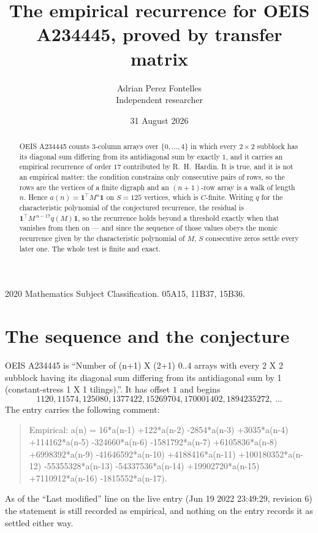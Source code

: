 \documentclass[11pt,a4paper]{article}
\title{The empirical recurrence for OEIS A234445, proved by transfer matrix}
\author{Adrian Perez Fontelles\\ \small Independent researcher}
\date{31 August 2026}
\theoremstyle{plain}
\theoremstyle{definition}
\begin{document}
\maketitle

\begin{abstract}
OEIS A234445 counts $3$-column arrays over $\{0,\dots,4\}$ in which every
$2\times2$ subblock has its diagonal sum differing from its antidiagonal sum by
exactly $1$, and it
carries an empirical recurrence of order $17$ contributed by R.~H.~Hardin. It is true,
and it is not an empirical matter: the condition constrains only consecutive pairs of rows,
so the rows are the vertices of a finite digraph and an $(n+1)$-row array is a walk of
length $n$. Hence $a(n)=\mathbf{1}^{\!\top}M^{n}\mathbf{1}$ on $S=125$ vertices, which
is $C$-finite. Writing $q$ for the characteristic polynomial of the conjectured recurrence,
the residual is $\mathbf{1}^{\!\top}M^{\,n-17}q(M)\mathbf{1}$, so the recurrence
holds beyond a threshold exactly when that vanishes from then on --- and since the sequence
of those values obeys the monic recurrence given by the characteristic polynomial of $M$,
$S$ consecutive zeros settle every later one. The whole test is finite and exact.
\end{abstract}

\noindent\small 2020 Mathematics Subject Classification. 05A15, 11B37, 15B36.\normalsize

\section{The sequence and the conjecture}

OEIS A234445 is ``Number of (n+1) X (2+1) 0..4 arrays with every 2 X 2 subblock having its diagonal sum differing from its antidiagonal sum by 1 (constant-stress 1 X 1 tilings).''. It has offset
$1$ and begins
\[
1120, 11574, 125080, 1377422, 15269704, 170001402, 1894235272,\ \dots
\]
The entry carries the following comment:
\begin{quote}\small
Empirical: a(n) = 16*a(n-1) +122*a(n-2) -2854*a(n-3) +3035*a(n-4) +114162*a(n-5) -324660*a(n-6) -1581792*a(n-7) +6105836*a(n-8) +6998392*a(n-9) -41646592*a(n-10) +4188416*a(n-11) +100180352*a(n-12) -55355328*a(n-13) -54337536*a(n-14) +19902720*a(n-15) +7110912*a(n-16) -1815552*a(n-17).
\end{quote}
As of the ``Last modified'' line on the live entry (Jun 19 2022 23:49:29, revision 6) the statement is
still recorded as empirical, and nothing on the entry records it as settled either way.
\end{document}
